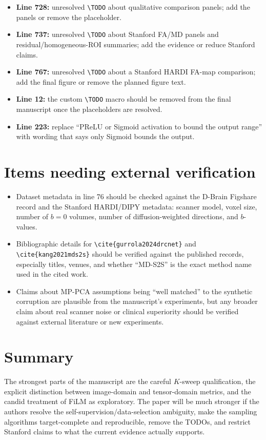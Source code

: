 \documentclass[11pt]{article}
\begin{document}
\begin{itemize}
  \item \textbf{Line 728:} unresolved \texttt{\textbackslash TODO} about qualitative comparison panels; add the panels or remove the placeholder.
  \item \textbf{Line 737:} unresolved \texttt{\textbackslash TODO} about Stanford FA/MD panels and residual/homogeneous-ROI summaries; add the evidence or reduce Stanford claims.
  \item \textbf{Line 767:} unresolved \texttt{\textbackslash TODO} about a Stanford HARDI FA-map comparison; add the final figure or remove the planned figure text.
  \item \textbf{Line 12:} the custom \texttt{\textbackslash TODO} macro should be removed from the final manuscript once the placeholders are resolved.
  \item \textbf{Line 223:} replace ``PReLU or Sigmoid activation to bound the output range'' with wording that says only Sigmoid bounds the output.
\end{itemize}

\section*{Items needing external verification}

\begin{itemize}
  \item Dataset metadata in line 76 should be checked against the D-Brain Figshare record and the Stanford HARDI/DIPY metadata: scanner model, voxel size, number of $b=0$ volumes, number of diffusion-weighted directions, and $b$-values.
  \item Bibliographic details for \texttt{\textbackslash cite\{gurrola2024drcnet\}} and \texttt{\textbackslash cite\{kang2021mds2s\}} should be verified against the published records, especially titles, venues, and whether ``MD-S2S'' is the exact method name used in the cited work.
  \item Claims about MP-PCA assumptions being ``well matched'' to the synthetic corruption are plausible from the manuscript's experiments, but any broader claim about real scanner noise or clinical superiority should be verified against external literature or new experiments.
\end{itemize}

\section*{Summary}

The strongest parts of the manuscript are the careful $K$-sweep qualification, the explicit distinction between image-domain and tensor-domain metrics, and the candid treatment of FiLM as exploratory. The paper will be much stronger if the authors resolve the self-supervision/data-selection ambiguity, make the sampling algorithms target-complete and reproducible, remove the TODOs, and restrict Stanford claims to what the current evidence actually supports.
\end{document}
